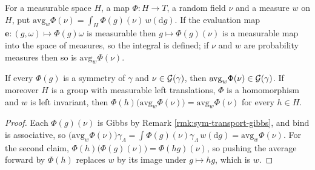 \begin{definition}
    \label{def:sym-group-average}
    \leanok

    For a measurable space $H$, a map $\Phi : H \to T$, a random field $\nu$ and a measure $w$
    on $H$, put $\mathrm{avg}_w \Phi(\nu) = \int_H \Phi(g)(\nu)\, w(\mathrm{d}g)$. If the
    evaluation map $\mathbf{e} : (g,\omega) \mapsto \Phi(g)\omega$ is measurable then
    $g \mapsto \Phi(g)(\nu)$ is a measurable map into the space of measures, so the integral is
    defined; if $\nu$ and $w$ are probability measures then so is $\mathrm{avg}_w \Phi(\nu)$.
\end{definition}

\begin{lemma}
    \label{lem:sym-group-average-invariant}
    \leanok

    If every $\Phi(g)$ is a symmetry of $\gamma$ and $\nu \in \mathcal{G}(\gamma)$, then
    $\mathrm{avg}_w \Phi(\nu) \in \mathcal{G}(\gamma)$. If moreover $H$ is a group with measurable
    left translations, $\Phi$ is a homomorphism and $w$ is left invariant, then
    $\Phi(h)\bigl(\mathrm{avg}_w \Phi(\nu)\bigr) = \mathrm{avg}_w \Phi(\nu)$ for every
    $h \in H$.
\end{lemma}
\begin{proof}
    \leanok

    Each $\Phi(g)(\nu)$ is Gibbs by Remark \ref{rmk:sym-transport-gibbs}, and
    $\mathrm{bind}$ is associative, so $\bigl(\mathrm{avg}_w \Phi(\nu)\bigr)\gamma_\Lambda
    = \int \Phi(g)(\nu)\gamma_\Lambda\, w(\mathrm{d}g) = \mathrm{avg}_w \Phi(\nu)$. For the
    second claim, $\Phi(h)\bigl(\Phi(g)(\nu)\bigr) = \Phi(hg)(\nu)$, so pushing the average
    forward by $\Phi(h)$ replaces $w$ by its image under $g \mapsto hg$, which is $w$.
\end{proof}

